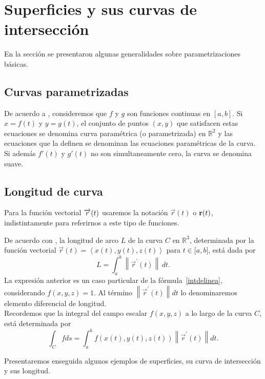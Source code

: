 \chapter{Superficies y sus curvas de intersección}

En la sección  se presentaron algunas generalidades
sobre parametrizaciones básicas.
\section{Curvas parametrizadas} 
De acuerdo a \cite{thomas_calculo_2015}, consideremos que $f$ y $g$ son funciones continuas en $[a,b]$.
Si $x=f(t) $ y $y=g(t)$, el conjunto de puntos $(x,y)$ que satisfacen estas ecuaciones se denomina curva paramétrica
(o parametrizada) en $\mathbb{R}^2$ y las ecuaciones que la definen se denominan las ecuaciones paramétricas
de la curva. Si además $f'(t)$ y $g'(t)$ no son simultaneamente cero, la curva se denomina suave.
\section{Longitud de curva} 
Para la función  vectorial $\overrightarrow{r}(t)$ usaremos la notación
$\overrightarrow{r}(t)$ o ${\bf r}(t)$, indistintamente para referirnos a
este tipo de funciones.

De acuerdo con \cite{marsden_calculo_2013}, la longitud de arco $L$ de la curva $C$ en $\mathbb{R}^3$, determinada por la función vectorial
$\overrightarrow{r}(t)=\left\langle x(t) ,y(t),z(t) \right\rangle$ para $t\in \lbrack a,b]$, está dada por
\begin{equation} \label{curvas}
L=\int_{a}^{b} \left\| \overrightarrow{r}^{\prime }(t)\right\| \, dt.
\end{equation}
La expresión anterior es un caso particular de la fórmula~\ref{intdelinea}, considerando $f(x,y,z)=1$.
Al término $\left\| \overrightarrow{r}^{\prime }(t)\right\|dt$ lo denominaremos elemento diferencial de longitud.
\\
Recordemos que la integral del campo escalar $f\left( x,y,z\right) $ a lo largo de la curva $C$,
está determinada por
$$\int_{C}fds=\int_{a}^{b}f\left( x\left( t\right) ,y\left( t\right) ,z\left(
t\right) \right) \left\| \overrightarrow{r}^{\prime }\left( t\right)\right\| dt.$$

Presentaremos enseguida algunos ejemplos de superficies, su curva de intersección y sus longitud.

